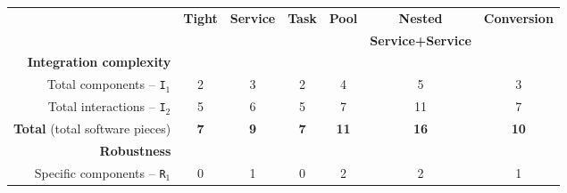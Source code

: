 \documentclass[preprint,3p,twocolumn]{elsarticle}
\newcommand{\correction}[1]{\color{blue}#1\color{black}\xspace}
\begin{document}
\begin{table}
\footnotesize
\centering
\begin{tabular}{rcccccc}
                                     & \textbf{Tight}
                                     & \textbf{Service}
                                     & \textbf{Task}
                                     & \textbf{Pool}
                                     & \textbf{Nested}
                                     & \textbf{Conversion} \\
&&&&& \textbf{\correction{Service+Service}}&\\
\cellcolor[HTML]{EEEEEE}\textbf{Integration complexity}& \multicolumn{6}{l}{\cellcolor[HTML]{EEEEEE}}\\
  Total components -- \texttt{I$_1$} & \cellcolor[HTML]{99FF99}2
                                     & \cellcolor[HTML]{99DD99}3
                                     & \cellcolor[HTML]{99FF99}2
                                     & \cellcolor[HTML]{99BB99}4
                                     & \cellcolor[HTML]{999999}5
                                     & \cellcolor[HTML]{99DD99}3\\
Total interactions -- \texttt{I$_2$} & \cellcolor[HTML]{99FF99}5
                                     & \cellcolor[HTML]{99EE99}6
                                     & \cellcolor[HTML]{99FF99}5
                                     & \cellcolor[HTML]{99DD99}7
                                     & \cellcolor[HTML]{999999}11
                                     & \cellcolor[HTML]{99DD99}7\\
\textbf{Total} (total software pieces) & \cellcolor[HTML]{99FF99}\textbf{7}
                                     & \cellcolor[HTML]{99E899}\textbf{9}
                                     & \cellcolor[HTML]{99FF99}\textbf{7}
                                     & \cellcolor[HTML]{99D299}\textbf{11}
                                     & \cellcolor[HTML]{999999}\textbf{16}
                                     & \cellcolor[HTML]{99DD99}\textbf{10}\\
\cellcolor[HTML]{EEEEEE}\textbf{Robustness}& \multicolumn{6}{l}{\cellcolor[HTML]{EEEEEE}}\\
Specific components -- \texttt{R$_1$} & \cellcolor[HTML]{99FF99}0
                                     & \cellcolor[HTML]{99CC99}1
                                     & \cellcolor[HTML]{99FF99}0
                                     & \cellcolor[HTML]{999999}2
                                     & \cellcolor[HTML]{999999}2
                                     & \cellcolor[HTML]{99CC99}1\\

\end{tabular}
\end{table}
\end{document}

